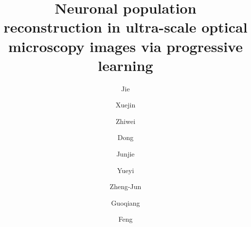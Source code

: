 \documentclass[times,twocolumn,final]{elsarticle}
\begin{document}
	

\begin{frontmatter}

\title{Neuronal population reconstruction in ultra-scale optical microscopy images via progressive learning}                       

\author{Jie }
\author{Xuejin }
\author{Zhiwei  }
\author{Dong }
\author{Junjie  }
\author{Yueyi }
\author{Zheng-Jun }
\author{Guoqiang }
\author{Feng }

\address{National Engineering Laboratory for Brain-inspired Intelligence Technology and Application, University of Science and Technology of China, No. 96 Jinzhai Road, Hefei, Anhui, 230026, China} 



\end{frontmatter}
\end{document}
